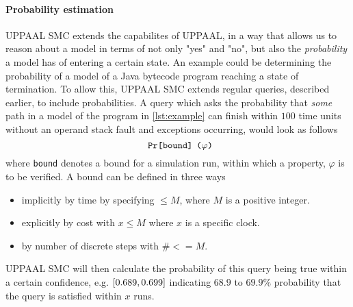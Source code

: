 \paragraph{Probability estimation}
UPPAAL SMC extends the capabilites of UPPAAL, in a way that allows us to reason about a model in terms of not only "yes" and "no", but also the \textit{probability} a model has of entering a certain state. An example could be determining the probability of a model of a Java bytecode program reaching a state of termination. To allow this, UPPAAL SMC extends regular queries, described earlier, to include probabilities. A query which asks the probability that \textit{some} path in a model of the program in \cref{lst:example} can finish within $100$ time units without an operand stack fault and exceptions occurring, would look as follows\\
$$\texttt{Pr\relax[bound\relax] ($\varphi$)}$$
where \texttt{bound} denotes a bound for a simulation run, within which a property, $\varphi$ is to be verified. A bound can be defined in three ways~\cite[p. 402]{smc}

\begin{itemize}
\item implicitly by time by specifying $\leq M$, where $M$ is a positive integer.
\item explicitly by cost with $x \leq M$ where $x$ is a specific clock.
\item by number of discrete steps with $\# <= M$. 
\end{itemize}

UPPAAL SMC will then calculate the probability of this query being true within a certain confidence, e.g. $\relax[0.689, 0.699]$ indicating $68.9$ to $69.9\%$ probability that the query is satisfied within $x$ runs.


